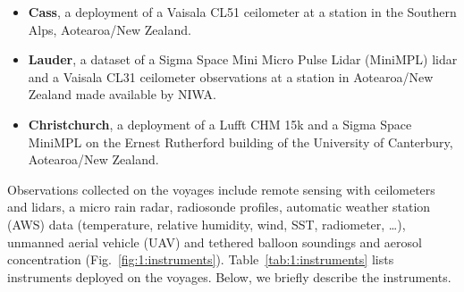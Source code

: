 \begin{itemize}
\item \textbf{Cass}, a deployment of a Vaisala CL51 ceilometer at a station in the
Southern Alps, Aotearoa/New Zealand.
\item \textbf{Lauder}, a dataset of a Sigma Space Mini Micro Pulse Lidar (MiniMPL) lidar and a Vaisala CL31
ceilometer observations at a station in Aotearoa/New Zealand made available by NIWA.
\item \textbf{Christchurch}, a deployment of a Lufft CHM 15k and a Sigma Space MiniMPL on the
Ernest Rutherford building of the University of Canterbury, Aotearoa/New
Zealand.
\end{itemize}

\begin{table}
\caption[Table of instruments]{
Table of instruments.
See also Table\ \ref{tab:3:alcs} for technical details of the ceilometers and lidars.
Legend: pressure (p), temperature (T), relative humidity (RH), cloud base height (CBH), rain rate (RR).
}
\label{tab:1:instruments}
\centerline{}
\end{table}

Observations collected on the voyages include remote sensing with ceilometers and lidars,
a micro rain radar, radiosonde profiles, automatic weather station (AWS) data (temperature, relative humidity,
wind, SST, radiometer, \ldots), unmanned aerial vehicle (UAV) and tethered balloon soundings and
aerosol concentration (Fig.\ \ref{fig:1:instruments}). Table\ \ref{tab:1:instruments}
lists instruments deployed on the voyages.
Below, we briefly describe the instruments.

